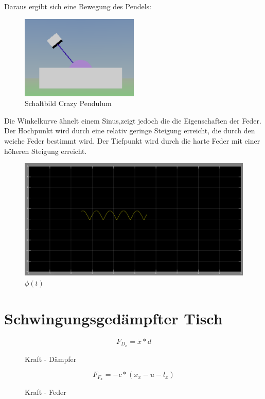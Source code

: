 \documentclass[10pt,a4paper]{article}
\begin{document}
 	Daraus ergibt sich eine Bewegung des Pendels:
 	 	\begin{figure}[H]
 	 		\centering
 	 		\includegraphics[width=0.5\textwidth]{../aufgabe2/pendel.png}
 	 		\caption{Schaltbild Crazy Pendulum}
 	 	\end{figure}
 	Die Winkelkurve ähnelt einem Sinus,zeigt jedoch die die Eigenschaften der Feder. Der Hochpunkt wird durch eine relativ geringe Steigung erreicht, die durch den weiche Feder bestimmt wird. Der Tiefpunkt wird durch die harte Feder mit einer höheren Steigung erreicht. 
 		\begin{figure}[H]
 	 		\centering
 	 		\includegraphics[width=1\textwidth]{../aufgabe2/phit.png}
 	 		\caption{$\phi(t)$}
 	 	\end{figure}

\section{Schwingungsgedämpfter Tisch}

\begin{figure}[H]
\begin{equation}
	F_{D_x} = \dot{x} * d
\end{equation}
\caption{Kraft - Dämpfer}
\end{figure}

\begin{figure}[H]
\begin{equation}
	F_{F_x} = -c * (x_x - u - l_x)
\end{equation}
\caption{Kraft - Feder}
\end{figure}
\end{document}
